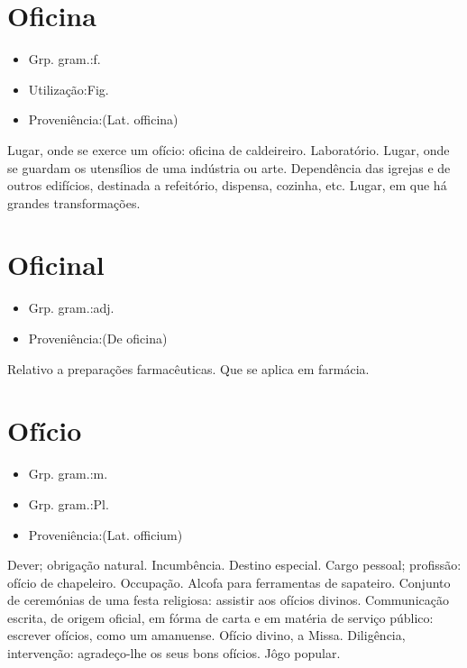 \section{Oficina}
\begin{itemize}
\item {Grp. gram.:f.}
\end{itemize}
\begin{itemize}
\item {Utilização:Fig.}
\end{itemize}
\begin{itemize}
\item {Proveniência:(Lat. \textunderscore officina\textunderscore )}
\end{itemize}
Lugar, onde se exerce um ofício: \textunderscore oficina de caldeireiro\textunderscore .
Laboratório.
Lugar, onde se guardam os utensílios de uma indústria ou arte.
Dependência das igrejas e de outros edifícios, destinada a refeitório, dispensa, cozinha, etc.
Lugar, em que há grandes transformações.
\section{Oficinal}
\begin{itemize}
\item {Grp. gram.:adj.}
\end{itemize}
\begin{itemize}
\item {Proveniência:(De \textunderscore oficina\textunderscore )}
\end{itemize}
Relativo a preparações farmacêuticas.
Que se aplica em farmácia.
\section{Ofício}
\begin{itemize}
\item {Grp. gram.:m.}
\end{itemize}
\begin{itemize}
\item {Grp. gram.:Pl.}
\end{itemize}
\begin{itemize}
\item {Proveniência:(Lat. \textunderscore officium\textunderscore )}
\end{itemize}
Dever; obrigação natural.
Incumbência.
Destino especial.
Cargo pessoal; profissão: \textunderscore ofício de chapeleiro\textunderscore .
Occupação.
Alcofa para ferramentas de sapateiro.
Conjunto de ceremónias de uma festa religiosa: \textunderscore assistir aos ofícios divinos\textunderscore .
Communicação escrita, de origem oficial, em fórma de carta e em matéria de serviço público: \textunderscore escrever ofícios, como um amanuense\textunderscore .
\textunderscore Ofício divino\textunderscore , a Missa.
Diligência, intervenção: \textunderscore agradeço-lhe os seus bons ofícios\textunderscore .
Jôgo popular.
